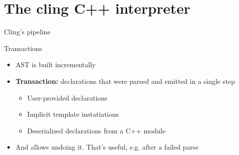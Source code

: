 \section{The cling C++ interpreter}

\begin{frame}[fragile]{Cling's pipeline}
  

\end{frame}

\begin{frame}[fragile]{Transactions}
  \begin{itemize}
    \itemsep=1ex

  \item AST is built incrementally

  \item \textbf{Transaction:} declarations that were parsed and emitted in a single step
    \begin{itemize}
    \item User-provided declarations
    \item Implicit template instatiations
    \item Deserialized declarations from a C++ module
    \end{itemize}

  \item And allows undoing it.  That's useful, e.g. after a failed parse
  \end{itemize}
\end{frame}

